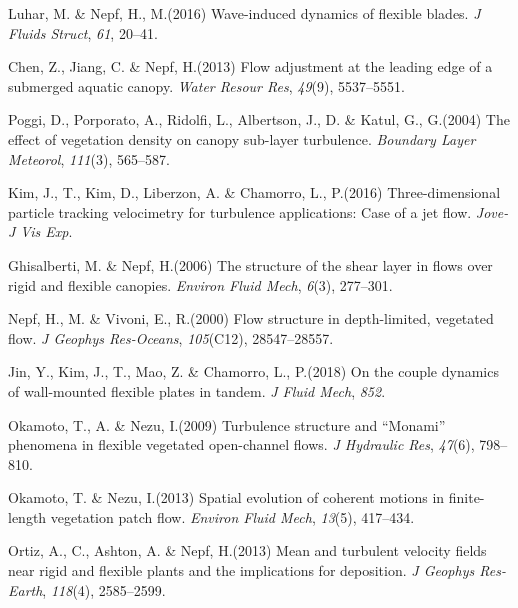 \documentclass[lineno,authoryear]{FLO_v1}%
\theoremstyle{definition}
\begin{document}
\begin{Backmatter}
\begin{thebibliography}{}
Luhar, M. {\&} Nepf, H., M.(2016)
Wave-induced dynamics of flexible blades.
	\textit{J Fluids Struct}, \textit{61}, 20--41.

Chen, Z., Jiang, C. {\&} Nepf, H.(2013)
Flow adjustment at the leading edge of a submerged aquatic canopy.
	\textit{Water Resour Res}, \textit{49}(9), 5537--5551.

Poggi, D., Porporato, A., Ridolfi, L., Albertson, J., D. {\&} Katul, G., G.(2004)
The effect of vegetation density on canopy sub-layer turbulence.
	\textit{Boundary Layer Meteorol}, \textit{111}(3), 565--587.

Kim, J., T., Kim, D., Liberzon, A. {\&} Chamorro, L., P.(2016)
Three-dimensional particle tracking velocimetry for turbulence applications: Case of a jet flow.
	\textit{Jove-J Vis Exp}.

Ghisalberti, M. {\&} Nepf, H.(2006)
The structure of the shear layer in flows over rigid and flexible canopies.
	\textit{Environ Fluid Mech}, \textit{6}(3), 277--301.

Nepf, H., M. {\&} Vivoni, E., R.(2000)
Flow structure in depth-limited, vegetated flow.
	\textit{J Geophys Res-Oceans}, \textit{105}(C12), 28547--28557.

Jin, Y., Kim, J., T., Mao, Z. {\&} Chamorro, L., P.(2018)
On the couple dynamics of wall-mounted flexible plates in tandem.
	\textit{J Fluid Mech}, \textit{852}.

Okamoto, T., A. {\&} Nezu, I.(2009)
Turbulence structure and “Monami” phenomena in flexible vegetated open-channel flows.
	\textit{J Hydraulic Res}, \textit{47}(6), 798--810.

Okamoto, T. {\&} Nezu, I.(2013)
Spatial evolution of coherent motions in finite-length vegetation patch flow.
	\textit{Environ Fluid Mech}, \textit{13}(5), 417--434.

Ortiz, A., C., Ashton, A. {\&} Nepf, H.(2013)
Mean and turbulent velocity fields near rigid and flexible plants and the implications for deposition.
	\textit{J Geophys Res-Earth}, \textit{118}(4), 2585--2599.


\end{thebibliography}
\end{Backmatter}
\end{document}
